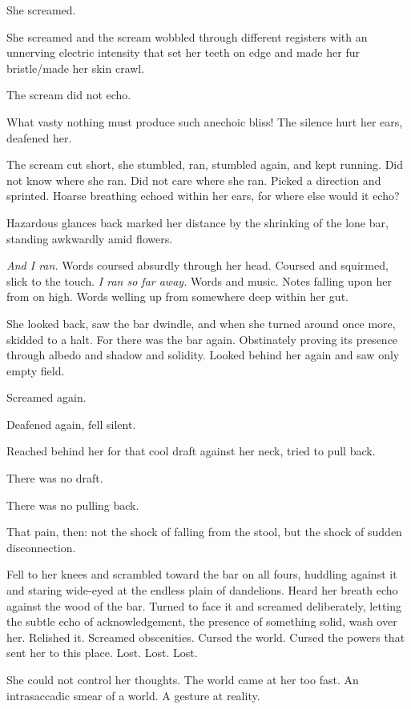She screamed.

She screamed and the scream wobbled through different registers with an unnerving electric intensity that set her teeth on edge and made her fur bristle/made her skin crawl.

The scream did not echo.

What vasty nothing must produce such anechoic bliss! The silence hurt her ears, deafened her.

The scream cut short, she stumbled, ran, stumbled again, and kept running. Did not know where she ran. Did not care where she ran. Picked a direction and sprinted. Hoarse breathing echoed within her ears, for where else would it echo?

Hazardous glances back marked her distance by the shrinking of the lone bar, standing awkwardly amid flowers.

\emph{And I ran.} Words coursed absurdly through her head. Coursed and squirmed, slick to the touch. \emph{I ran so far away.} Words and music. Notes falling upon her from on high. Words welling up from somewhere deep within her gut.

She looked back, saw the bar dwindle, and when she turned around once more, skidded to a halt. For there was the bar again. Obstinately proving its presence through albedo and shadow and solidity. Looked behind her again and saw only empty field.

Screamed again.

Deafened again, fell silent.

Reached behind her for that cool draft against her neck, tried to pull back.

There was no draft.

There was no pulling back.

That pain, then: not the shock of falling from the stool, but the shock of sudden disconnection.

Fell to her knees and scrambled toward the bar on all fours, huddling against it and staring wide-eyed at the endless plain of dandelions. Heard her breath echo against the wood of the bar. Turned to face it and screamed deliberately, letting the subtle echo of acknowledgement, the presence of something solid, wash over her. Relished it. Screamed obscenities. Cursed the world. Cursed the powers that sent her to this place. Lost. Lost. Lost.

She could not control her thoughts. The world came at her too fast. An intrasaccadic smear of a world. A gesture at reality.

